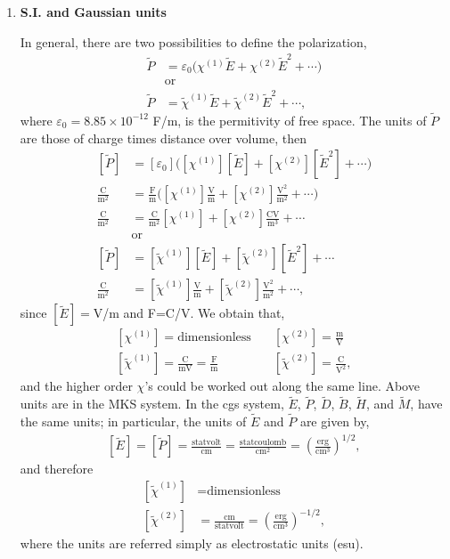 \documentclass[12pt]{article}
\numberwithin{equation}{section}
\begin{document}
\begin{enumerate}

\item {\bf S.I. and Gaussian units}


In general, there are two possibilities to define the
  polarization,
\begin{align}\label{u.69}
\tilde P&=\varepsilon_0\Big(\chi^{(1)}\tilde E+\chi^{(2)}\tilde E^2+\cdots\Big) 
\\
&\text{or}
\nonumber\\\label{u.69n}
\tilde P&=\tilde\chi^{(1)}\tilde E+\tilde\chi^{(2)}\tilde E^2+\cdots  
,
\end{align}  
where $\varepsilon_0=8.85 \times 10^{−12}$ F/m, is the permitivity of free space.
The units of $\tilde P$ 
are those of charge times distance over
volume, then 
\begin{align}\label{u.691}
[\tilde P]&=[\varepsilon_0]\Big([\chi^{(1)}][\tilde E]+[\chi^{(2)}][\tilde E^2]+\cdots\Big) 
\nonumber\\
\frac{\text{C}}{\text{m}^2}&=
\frac{\text{F}}{\text{m}}
\Big([\chi^{(1)}]\frac{\text{V}}{\text{m}}
+[\chi^{(2)}]\frac{\text{V}^2}{\text{m}^2}
+\cdots\Big) 
\nonumber\\
\frac{\text{C}}{\text{m}^2}&=
\frac{\text{C}}{\text{m}^2}
[\chi^{(1)}]
+[\chi^{(2)}]\frac{\text{CV}}{\text{m}^3}
+\cdots 
\nonumber\\
&\text{or}
\nonumber\\
[\tilde P]&=[\tilde\chi^{(1)}][\tilde E]+[\tilde\chi^{(2)}][\tilde E^2]+\cdots 
\nonumber\\
\frac{\text{C}}{\text{m}^2}&=
[\tilde\chi^{(1)}]\frac{\text{V}}{\text{m}}
+[\tilde\chi^{(2)}]\frac{\text{V}^2}{\text{m}^2}
+\cdots 
,
\end{align}  
since $[\tilde E]=$V/m and F=C/V. We obtain that,
\begin{align}\label{u.693}
[\chi^{(1)}]=\text{dimensionless}
&\quad 
[\chi^{(2)}]=\frac{\text{m}}{\text{V}}
\nonumber\\
[\tilde\chi^{(1)}]=\frac{\text{C}}{\text{mV}}=\frac{\text{F}}{\text{m}}
&\quad 
[\tilde\chi^{(2)}]=\frac{\text{C}}{\text{V}^2}
,
\end{align}
and the higher order $\chi$'s could be worked out along the same
line. Above units are in the MKS system. In the cgs system, 
$\tilde E$, $\tilde P$, $\tilde D$, $\tilde B$, $\tilde H$, and
$\tilde M$, have the same units; in particular, the units of $\tilde
E$ and $\tilde P$ are given by,
\begin{align}\label{u.2}
[\tilde E]=[\tilde P]=
\frac{\text{statvolt}}{\text{cm}}
=
\frac{\text{statcoulomb}}{\text{cm}^2}
=
\left(\frac{\text{erg}}{\text{cm}^3}\right)^{1/2}
,
\end{align} 
and therefore 
\begin{align}\label{u.3}
[\tilde \chi^{(1)}]&=\text{dimensionless}
\nonumber\\
[\tilde \chi^{(2)}]&=
\frac{\text{cm}}{\text{statvolt}}
=\left(\frac{\text{erg}}{\text{cm}^3}\right)^{-1/2}
,
\end{align}
where the units are referred simply as electrostatic units (esu). 


\end{enumerate}
\end{document}
